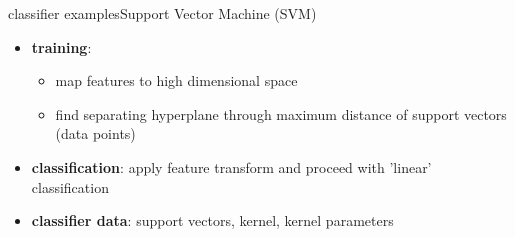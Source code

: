         \begin{frame}{classifier examples}{Support Vector Machine (SVM)}
            \begin{itemize}
                \item	\textbf{training}:
                    \begin{itemize}
                        \item   map features to high dimensional space
                        \item   find separating hyperplane through maximum distance of support vectors (data points)
                    \end{itemize}
                \item<2->	\textbf{classification}: apply feature transform and proceed with 'linear' classification
                \item<3->	\textbf{classifier data}: support vectors, kernel, kernel parameters
            \end{itemize}
        \end{frame}
    
